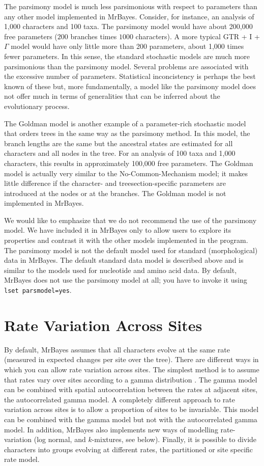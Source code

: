 \documentclass[12pt]{book}
\begin{document}
The parsimony model is much less parsimonious with respect to parameters than any other model
implemented in MrBayes. Consider, for instance, an analysis of 1,000 characters and 100 taxa. The
parsimony model would have about 200,000 free parameters ($200$ branches times $1000$ characters).
A more typical GTR + I + $\Gamma$ model would have only little more than 200 parameters, about
1,000 times fewer parameters. In this sense, the standard stochastic models are much more
parsimonious than the parsimony model. Several problems are associated with the excessive number of
parameters.  Statistical inconcistency is perhaps the best known of these but, more fundamentally,
a model like the parsimony model does not offer much in terms of generalities that can be inferred
about the evolutionary process.

The Goldman \citep{goldman93} model is another example of a parameter-rich stochastic model that
orders trees in the same way as the parsimony method. In this model, the branch lengths are the
same but the ancestral states are estimated for all characters and all nodes in the tree. For an
analysis of 100 taxa and 1,000 characters, this results in approximately 100,000 free parameters.
The Goldman model is actually very similar to the No-Common-Mechanism model; it makes little
difference if the character- and treesection-specific parameters are introduced at the nodes or at
the branches. The Goldman model is not implemented in MrBayes.

We would like to emphasize that we do not recommend the use of the parsimony model. We have
included it in MrBayes only to allow users to explore its properties and contrast it with the other
models implemented in the program. The parsimony model is not the default model used for standard
(morphological) data in MrBayes. The default standard data model is described above and is similar
to the models used for nucleotide and amino acid data. By default, MrBayes does not use the
parsimony model at all; you have to invoke it using \texttt{lset parsmodel=yes}.

\section{Rate Variation Across Sites}

By default, MrBayes assumes that all characters evolve at the same rate (measured in expected
changes per site over the tree). There are different ways in which you can allow rate variation
across sites. The simplest method is to assume that rates vary over sites according to a gamma
distribution \citep{yang93}. The gamma model can be combined with spatial autocorrelation between
the rates at adjacent sites, the autocorrelated gamma model. A completely different approach to
rate variation across sites is to allow a proportion of sites to be invariable. This model can be
combined with the gamma model but not with the autocorrelated gamma model. In addition, MrBayes
also implements new ways of modelling rate-variation (log normal, and $k$-mixtures, see below).
Finally, it is possible to divide characters into groups evolving at different rates, the
partitioned or site specific rate model.
\end{document}
